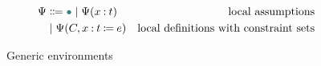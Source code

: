 \begin{figure}
\centering
\begin{align*}
\Psi &\Coloneqq \mt \mid \Psi(\assm{x}{t}) &\text{local assumptions} \\
    &\mid \Psi(C, \defn{x}{t}{e}) &\text{local definitions with constraint sets}
\end{align*}
\caption{Generic environments}
\label{fig:contexts-gen}
\end{figure}
